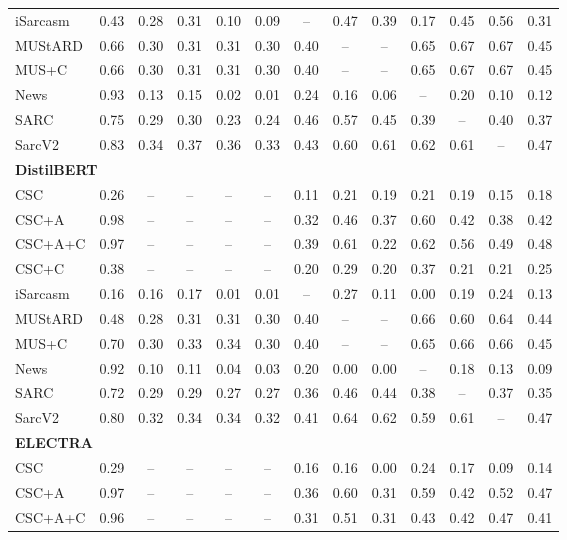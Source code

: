 \documentclass[sigconf, nonacm]{acmart}
\begin{document}
\begin{table}[htbp]
{\begin{tabular}{l|c|cccccccccc|c}
iSarcasm & 0.43 & 0.28 & 0.31 & 0.10 & 0.09 & -- & 0.47 & 0.39 & 0.17 & 0.45 & 0.56 & 0.31 \\
MUStARD & 0.66 & 0.30 & 0.31 & 0.31 & 0.30 & 0.40 & -- & -- & 0.65 & 0.67 & 0.67 & 0.45 \\
MUS+C & 0.66 & 0.30 & 0.31 & 0.31 & 0.30 & 0.40 & -- & -- & 0.65 & 0.67 & 0.67 & 0.45 \\
News & 0.93 & 0.13 & 0.15 & 0.02 & 0.01 & 0.24 & 0.16 & 0.06 & -- & 0.20 & 0.10 & 0.12 \\
SARC & 0.75 & 0.29 & 0.30 & 0.23 & 0.24 & 0.46 & 0.57 & 0.45 & 0.39 & -- & 0.40 & 0.37 \\
SarcV2 & 0.83 & 0.34 & 0.37 & 0.36 & 0.33 & 0.43 & 0.60 & 0.61 & 0.62 & 0.61 & -- & 0.47 \\
\midrule
\multicolumn{13}{l}{\textbf{DistilBERT}} \\
CSC & 0.26 & -- & -- & -- & -- & 0.11 & 0.21 & 0.19 & 0.21 & 0.19 & 0.15 & 0.18 \\
CSC+A & 0.98 & -- & -- & -- & -- & 0.32 & 0.46 & 0.37 & 0.60 & 0.42 & 0.38 & 0.42 \\
CSC+A+C & 0.97 & -- & -- & -- & -- & 0.39 & 0.61 & 0.22 & 0.62 & 0.56 & 0.49 & 0.48 \\
CSC+C & 0.38 & -- & -- & -- & -- & 0.20 & 0.29 & 0.20 & 0.37 & 0.21 & 0.21 & 0.25 \\
iSarcasm & 0.16 & 0.16 & 0.17 & 0.01 & 0.01 & -- & 0.27 & 0.11 & 0.00 & 0.19 & 0.24 & 0.13 \\
MUStARD & 0.48 & 0.28 & 0.31 & 0.31 & 0.30 & 0.40 & -- & -- & 0.66 & 0.60 & 0.64 & 0.44 \\
MUS+C & 0.70 & 0.30 & 0.33 & 0.34 & 0.30 & 0.40 & -- & -- & 0.65 & 0.66 & 0.66 & 0.45 \\
News & 0.92 & 0.10 & 0.11 & 0.04 & 0.03 & 0.20 & 0.00 & 0.00 & -- & 0.18 & 0.13 & 0.09 \\
SARC & 0.72 & 0.29 & 0.29 & 0.27 & 0.27 & 0.36 & 0.46 & 0.44 & 0.38 & -- & 0.37 & 0.35 \\
SarcV2 & 0.80 & 0.32 & 0.34 & 0.34 & 0.32 & 0.41 & 0.64 & 0.62 & 0.59 & 0.61 & -- & 0.47 \\
\midrule
\multicolumn{13}{l}{\textbf{ELECTRA}} \\
CSC & 0.29 & -- & -- & -- & -- & 0.16 & 0.16 & 0.00 & 0.24 & 0.17 & 0.09 & 0.14 \\
CSC+A & 0.97 & -- & -- & -- & -- & 0.36 & 0.60 & 0.31 & 0.59 & 0.42 & 0.52 & 0.47 \\
CSC+A+C & 0.96 & -- & -- & -- & -- & 0.31 & 0.51 & 0.31 & 0.43 & 0.42 & 0.47 & 0.41 \\

\end{tabular}}
\end{table}
\end{document}

